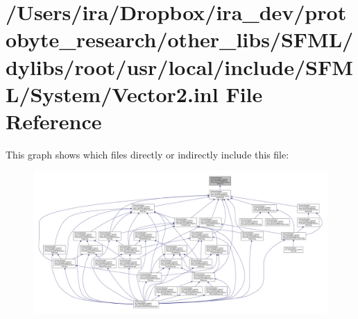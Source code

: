 \hypertarget{_vector2_8inl}{\section{/\-Users/ira/\-Dropbox/ira\-\_\-dev/protobyte\-\_\-research/other\-\_\-libs/\-S\-F\-M\-L/dylibs/root/usr/local/include/\-S\-F\-M\-L/\-System/\-Vector2.inl File Reference}
\label{_vector2_8inl}
}
This graph shows which files directly or indirectly include this file\-:
\nopagebreak
\begin{figure}[H]
\begin{center}
\leavevmode
\includegraphics[width=350pt]{_vector2_8inl__dep__incl}
\end{center}
\end{figure}
